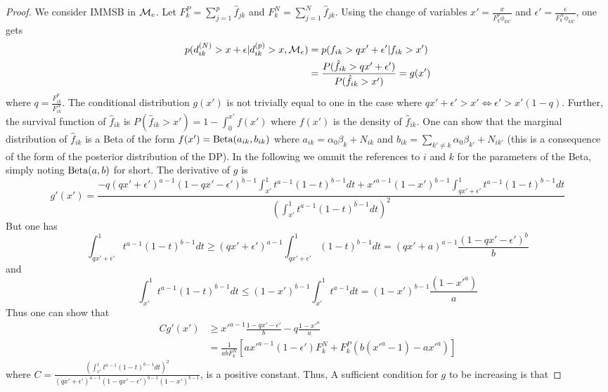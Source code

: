 \begin{proof}

We consider IMMSB in $\mathcal{M}_e$. Let $F_k^P=\sum_{j=1}^p \hat f_{jk}$ and $F_k^N=\sum_{j=1}^N \hat f_{jk}$. 
Using the change of variables $x'=\frac{x}{F_k^p \phi_{kk'}}$ and $\epsilon' = \frac{\epsilon}{F_k^N \phi_{kk'}}$, one gets
\begin{align*}
p(d_{ik}^{(N)} > x+\epsilon | d_{ik}^{(p)} > x, \mathcal{M}_e) &= p(f_{ik} > qx'+\epsilon' | f_{ik} > x') \\
&=\frac{P(\hat f_{ik} > qx'+\epsilon')}{P(\hat f_{ik} > x')} = g(x')
\end{align*}
where $q=\frac{F_{ik}^p}{F_{ik}^N}$. The conditional distribution $g(x')$ is not trivially equal to one in the case where $qx'+\epsilon' > x' \Leftrightarrow \epsilon' > x'(1-q)$. Further, the survival function of $\hat f_{ik}$ is $P(\hat f_{ik} >x') = 1-\int_0^{x'} f(x')$ where $f(x')$ is the density of $\hat f_{ik}$. One can show that the marginal distribution of $\hat f_{ik}$ is a Beta of the form $f(x')=\mathrm{Beta}(a_{ik}, b_{ik})$  where $a_{ik} = \alpha_0\beta_k + N_{ik}$ and $b_{ik} = \sum_{k'\neq k} \alpha_0\beta_{k'} + N_{ik'}$  (this is a consequence of the form of the posterior distribution of the DP). In the following we ommit the references to $i$ and $k$ for the parameters of the Beta, simply noting $\mathrm{Beta}(a, b)$ for short. The derivative of $g$ is
\begin{equation*}
g'(x') = \frac{-q (qx'+\epsilon')^{a-1}(1-qx'-\epsilon')^{b-1}\int_{x'}^1t^{a-1} (1-t)^{b-1} dt + x'^{a-1}(1-x')^{b-1}\int_{qx'+\epsilon'}^1 t^{a-1}(1-t)^{b-1} dt}{\left(\int_{x'}^1t^{a-1}(1-t)^{b-1}dt\right)^2}
\end{equation*}
But one has
\begin{equation*}
\int_{qx'+\epsilon'}^1 t^{a-1}(1-t)^{b-1}dt \geq (qx'+\epsilon')^{a-1}\int_{qx'+\epsilon'}^1 (1-t)^{b-1}dt = (qx'+a)^{a-1}\frac{(1-qx'-\epsilon')^b}{b}
\end{equation*}
and
\begin{equation*}
\int_{x'}^1 t^{a-1}(1-t)^{b-1}dt \leq (1-x')^{b-1}\int_{x'}^1 t^{a-1}dt = (1-x')^{b-1}\frac{(1-x'^a)}{a}
\end{equation*}
Thus one can show that
\begin{align*}
Cg'(x') &\geq x'^{a-1} \frac{1-qx'-\epsilon'}{b} -q\frac{1-x'^a}{a}  \\
        &= \frac{1}{abF_k^N} \left[ ax'^{a-1}(1-\epsilon')F_k^N + F_k^P (b(x'^a-1) - ax'^a) \right]
\end{align*}
where $C=\frac{\left(\int_{x'}^1t^{a-1}(1-t)^{b-1}dt\right)^2}{(qx'+\epsilon')^{a-1}(1-qx'-\epsilon')^{b-1}(1-x')^{b-1}}$, is a positive constant. Thus, A sufficient condition for $g$ to be increasing is that

\end{proof}
